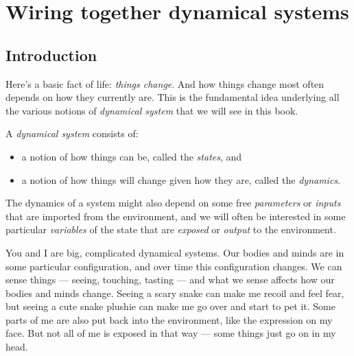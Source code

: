 \documentclass[DynamicalBook]{subfiles}
\begin{document}
%




\setcounter{chapter}{0}%


\chapter{Wiring together dynamical systems}\label{chapter.1}

\section{Introduction}\label{sec.chap1_intro}

Here's a basic fact of life: \emph{things change}. And how things change most
often depends on how they currently are. This is the fundamental idea underlying all the various notions of \emph{dynamical
  system} that we will see in this book.

\begin{informal}\label{inf.dynam_sys}
  A \emph{dynamical system} consists of:
  \begin{itemize}
  \item a notion of how things can be, called the \emph{states}, and
  \item a notion of how things will change given how they are, called the \emph{dynamics}.
  \end{itemize}
  The dynamics of a system might also depend on some free \emph{parameters} or \emph{inputs} that are imported from the environment, and
  we will often be interested in some particular \emph{variables} of the
  state that are \emph{exposed} or \emph{output} to the environment. 
\end{informal}

You and I are big, complicated dynamical systems. Our bodies and minds are in
some particular configuration, and over time this configuration changes. We can
sense things --- seeing, touching, tasting --- and what we sense affects how our
bodies and minds change. Seeing a scary snake can make me recoil and feel fear,
but seeing a cute snake plushie can make me go over and start to pet it.
Some parts of me are also put back into the environment, like the expression on
my face. But not all of me is exposed in that way --- some things just go on in
my head.
\end{document}
